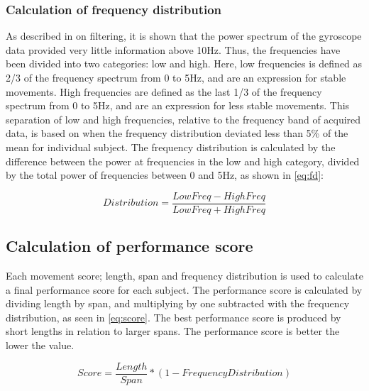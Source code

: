 \subsubsection{Calculation of frequency distribution}
As described in  on filtering, it is shown that the power spectrum of the gyroscope data provided very little information above 10Hz. Thus, the frequencies have been divided into two categories: low and high. Here, low frequencies is defined as 2/3 of the frequency spectrum from 0 to 5Hz, and are an expression for stable movements. High frequencies are defined as the last 1/3 of the frequency spectrum from 0 to 5Hz, and are an expression for less stable movements. This separation of low and high frequencies, relative to the frequency band of acquired data, is based on when the frequency distribution deviated less than 5\% of the mean for individual subject. The frequency distribution is calculated by the difference between the power at frequencies in the low and high category, divided by the total power of frequencies between 0 and 5Hz, as shown in \eqref{eq:fd}:

\begin{equation} \label{eq:fd}
Distribution = \frac{LowFreq-HighFreq}{LowFreq+HighFreq}
\end{equation}


\subsection{Calculation of performance score}
Each movement score; length, span and frequency distribution is used to calculate a final performance score for each subject. 
The performance score is calculated by dividing length by span, and multiplying by one subtracted with the frequency distribution, as seen in \eqref{eq:score}. The best performance score is produced by short lengths in relation to larger spans. The performance score is better the lower the value. 


\begin{equation} \label{eq:score}
Score = \frac{Length}{Span} * (1 - Frequency Distribution)
\end{equation}

